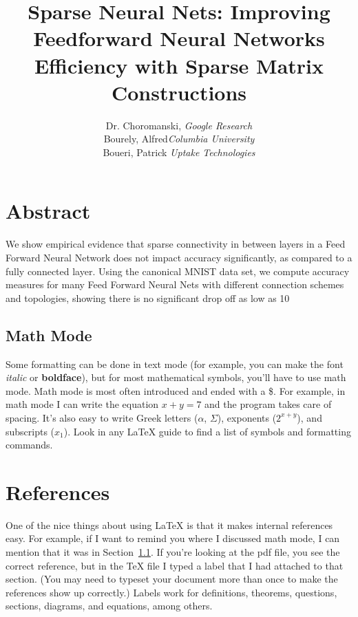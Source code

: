 \documentclass[a4paper,10pt,twocolumn]{article}
\theoremstyle{plain}
\theoremstyle{definition}
\begin{document}
 


\title{Sparse Neural Nets: Improving Feedforward Neural Networks Efficiency with Sparse Matrix Constructions}
\author{Dr. Choromanski, \textit{Google Research}\\ Bourely, Alfred\textit{Columbia University}\\ Boueri, Patrick \textit{Uptake Technologies}}
\maketitle

\section{Abstract}
We show empirical evidence that sparse connectivity in between layers in a Feed Forward Neural Network does not impact accuracy significantly, as compared to a fully connected layer. Using the canonical MNIST data set, we compute accuracy measures for many Feed Forward Neural Nets with different connection schemes and topologies, showing there is no significant drop off as low as 10%


\subsection{Math Mode}\label{section:mathmode}
Some formatting can be done in text mode (for example, you can make the font \textit{italic} or \textbf{boldface}), but for most mathematical symbols, you'll have to use math mode.  Math mode is most often introduced and ended with a \$.  For example, in math mode I can write the equation $x+ y=7$ and the program takes care of spacing.  It's also easy to write Greek letters ($\alpha$, $\Sigma$), exponents ($2^{x+y}$), and subscripts ($x_1$).  Look in any LaTeX guide to find a list of symbols and formatting commands.  

\section{References}
One of the nice things about using LaTeX is that it makes internal references easy.  For example, if I want to remind you where I discussed math mode, I can mention that it was in Section~\ref{section:mathmode}.  If you're looking at the pdf file, you see the correct reference, but in the TeX file I typed a label that I had attached to that section.  (You may need to typeset your document more than once to make the references show up correctly.)  Labels work for definitions, theorems, questions, sections, diagrams, and equations, among others.

 
\end{document}
